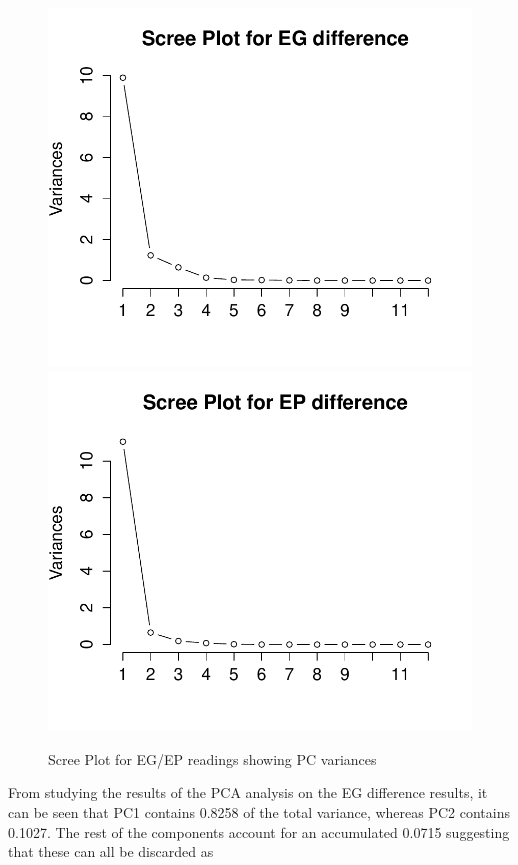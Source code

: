 \documentclass[twocolumn]{article}
\begin{document}
\begin{figure}[h!]
	\includegraphics[trim = 0mm 0mm 0mm 0mm, clip, scale=0.6]{EGScreePlot.pdf}
	\includegraphics[trim = 0mm 0mm 0mm 0mm, clip, scale=0.6]{EPScreePlot.pdf}
	\caption{Scree Plot for EG/EP readings showing PC variances}
	\label{fig:screeplot}
\end{figure}
From studying the results of the PCA analysis on the EG difference results, it can be seen that PC1 contains 0.8258 of the total variance, 
whereas PC2 contains 0.1027. The rest of the components account for an accumulated 0.0715 suggesting that these can all be discarded as 
\end{document}
